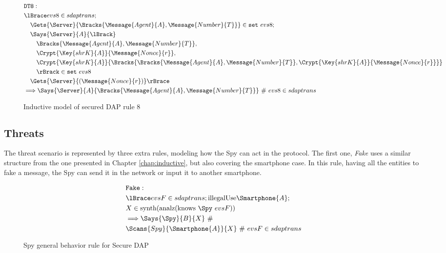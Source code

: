 \begin{figure}[!h]
  \begin{align*}
    & \texttt{DT8}: \newline \\
    & \lBrace evs8 \in sdaptrans; \\
    & \quad \Gets{\Server}{\Bracks{\Message{Agent}{A}, \Message{Number}{T}}} \in \texttt{set} \ evs8; \\
    & \quad \Says{\Server}{A}{\lBrack} \\
    & \qquad \Bracks{\Message{Agent}{A}, \Message{Number}{T}}, \\
    & \qquad \Crypt{\Key{shrK}{A}}{\Message{Nonce}{r}}, \\
    & \qquad \Crypt{\Key{shrK}{A}}{\Bracks{\Bracks{\Message{Agent}{A}, \Message{Number}{T}}, \Crypt{\Key{shrK}{A}}{\Message{Nonce}{r}}}} \\
    & \qquad \rBrack \in \texttt{set} \ evs8 \\
    & \quad \Gets{\Server}{(\Message{Nonce}{r})} \rBrace \\
    & \Longrightarrow \Says{\Server}{A}{\Bracks{\Message{Agent}{A}, \Message{Number}{T}}} \ \# \ evs8 \in sdaptrans
  \end{align*}
  \label{fig:dap-model-8}
  \caption{Inductive model of secured DAP rule 8}
\end{figure}

\subsection{Threats}
The threat scenario is represented by three extra rules, modeling how the Spy can act in the protocol. The first one, \textit{Fake} uses a similar structure from the one presented in Chapter \ref{chap:inductive}, but also covering the smartphone case. In this rule, having all the entities to fake a message, the Spy can send it in the network or input it to another smartphone.

\begin{figure}[!h]
  \begin{align*}
    & \texttt{Fake}: \newline \\
    & \lBrace evsF \in sdaptrans; \text{illegalUse} \Smartphone{A}; \\
    & X \in \text{synth}(\text{analz}(\text{knows} \ \Spy \ evsF)) \\
    & \Longrightarrow \Says{\Spy}{B}{X}\ \# \\ 
    & \Scans{Spy}{\Smartphone{A}}{X} \ \# \ evsF \in sdaptrans
  \end{align*}
  \label{fig:dap-model-threat-1}
  \caption{Spy general behavior rule for Secure DAP}
\end{figure}

